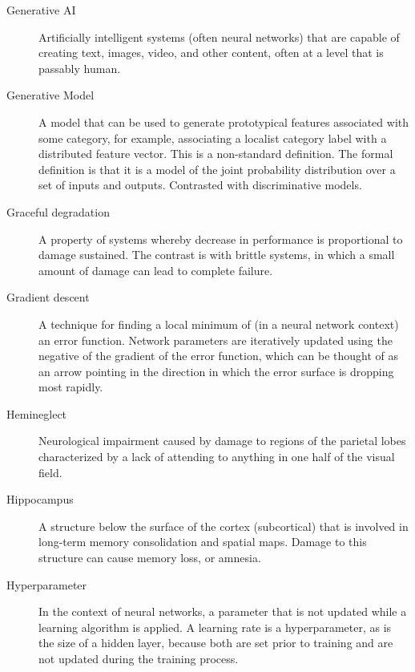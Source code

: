 \begin{description}
\item[Generative AI] Artificially intelligent systems (often neural networks) that are capable of creating text, images, video, and other content, often at a level that is passably human.

\item[Generative Model] A model that can be used to generate prototypical features associated with some category, for example, associating a localist category label with a distributed feature vector. This is a non-standard definition. The formal definition is that it is a model of the joint probability distribution over a set of inputs and outputs. Contrasted with discriminative models. 

\item[Graceful degradation] A property of systems whereby decrease in performance is proportional to damage sustained. The contrast is with brittle systems, in which a small amount of damage can lead to complete failure.

\item[Gradient descent] A technique for finding a local minimum of (in a neural network context) an error function. Network parameters are iteratively updated using the negative of the gradient of the error function, which can be thought of as an arrow pointing in the direction in which the error surface is dropping most rapidly.


\item[Hemineglect] Neurological impairment caused by damage to regions of the parietal lobes characterized by a lack of attending to anything in one half of the visual field.

\item[Hippocampus] A structure below the surface of the cortex (subcortical) that is involved in long-term memory consolidation and spatial maps. Damage to this structure can cause memory loss, or amnesia. 


\item[Hyperparameter] In the context of neural networks, a parameter that is not updated while a learning algorithm is applied. A learning rate is a hyperparameter, as is the size of a hidden layer, because both are set prior to training and are not updated during the training process.


\end{description}
